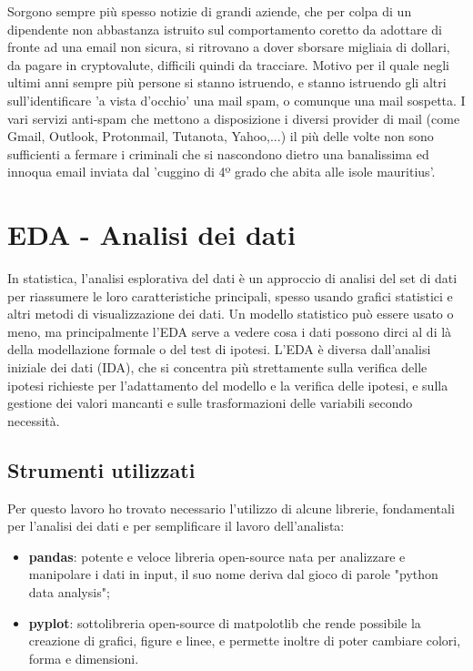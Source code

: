 \documentclass[12pt,a4paper]{article}
\begin{document}
Sorgono sempre più spesso notizie di grandi aziende, che per colpa di un dipendente non abbastanza istruito sul comportamento coretto da adottare di fronte ad una email non sicura, si ritrovano a dover sborsare migliaia di dollari, da pagare in cryptovalute, difficili quindi da tracciare.
\hfill \break
Motivo per il quale negli ultimi anni sempre più persone si stanno istruendo, e stanno istruendo gli altri sull'identificare 'a vista d'occhio' una mail spam, o comunque una mail sospetta.
\break
I vari servizi anti-spam che mettono a disposizione i diversi provider di mail (come Gmail, Outlook, Protonmail, Tutanota, Yahoo,...) il più delle volte non sono sufficienti a fermare i criminali che si nascondono dietro una banalissima ed innoqua email inviata dal 'cuggino di 4º grado che abita alle isole mauritius'.

\clearpage
\section{EDA - Analisi dei dati}
In statistica, l'analisi esplorativa del dati è un approccio di analisi del set di dati per riassumere le loro caratteristiche principali, spesso usando grafici statistici e altri metodi di visualizzazione dei dati. Un modello statistico può essere usato o meno, ma principalmente l'EDA serve a vedere cosa i dati possono dirci al di là della modellazione formale o del test di ipotesi. L'EDA è diversa dall'analisi iniziale dei dati (IDA), che si concentra più strettamente sulla verifica delle ipotesi richieste per l'adattamento del modello e la verifica delle ipotesi, e sulla gestione dei valori mancanti e sulle trasformazioni delle variabili secondo necessità.

\subsection{Strumenti utilizzati}
Per questo lavoro ho trovato necessario l'utilizzo di alcune librerie, fondamentali per l'analisi dei dati e per semplificare il lavoro dell'analista:
\begin{itemize}
    \item \textbf{pandas}: potente e veloce libreria open-source nata per analizzare e manipolare i dati in input, il suo nome deriva dal gioco di parole "python data analysis";
\end{itemize}

\begin{itemize}
    \item \textbf{pyplot}: sottolibreria open-source di matpolotlib che rende possibile la creazione di grafici, figure e linee, e permette inoltre di poter cambiare colori, forma e dimensioni.
\end{itemize}
\end{document}
